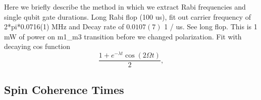     Here we briefly describe the method in which we extract Rabi frequencies and single qubit gate durations.
    Long Rabi flop (100 us), fit out carrier frequency of 2*pi*0.0716(1) MHz and
    Decay rate of $0.0107(7)$ 1 / us. See long flop. This is 1 mW of power on m1\_m3
    transition before we changed polarization. Fit with decaying cos function 
    \begin{equation}
        \frac{1 + e^{-\lambda t} \cos(2 \Omega t)}{2},
    \end{equation}


\subsection{Spin Coherence Times}
\label{sec:Coherence}


